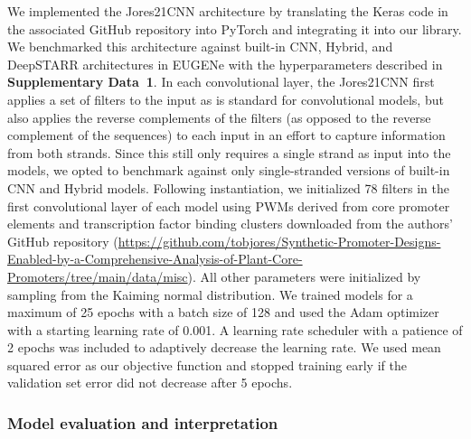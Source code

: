 We implemented the Jores21CNN architecture by translating the Keras code in the associated GitHub repository into PyTorch and integrating it into our library. We benchmarked this architecture against built-in CNN, Hybrid, and DeepSTARR architectures in EUGENe with the hyperparameters described in \textbf{Supplementary Data~1}. In each convolutional layer, the Jores21CNN first applies a set of filters to the input as is standard for convolutional models, but also applies the reverse complements of the filters (as opposed to the reverse complement of the sequences) to each input in an effort to capture information from both strands\cite{Onimaru2020-do}. Since this still only requires a single strand as input into the models, we opted to benchmark against only single-stranded versions of built-in CNN and Hybrid models. Following instantiation, we initialized 78 filters in the first convolutional layer of each model using PWMs derived from core promoter elements and transcription factor binding clusters downloaded from the authors’ GitHub repository (\url{https://github.com/tobjores/Synthetic-Promoter-Designs-Enabled-by-a-Comprehensive-Analysis-of-Plant-Core-Promoters/tree/main/data/misc}). All other parameters were initialized by sampling from the Kaiming normal distribution\cite{He2015-qh}. We trained models for a maximum of 25 epochs with a batch size of 128 and used the Adam optimizer with a starting learning rate of 0.001. A learning rate scheduler with a patience of 2 epochs was included to adaptively decrease the learning rate. We used mean squared error as our objective function and stopped training early if the validation set error did not decrease after 5 epochs.

\subsubsection{Model evaluation and interpretation}

